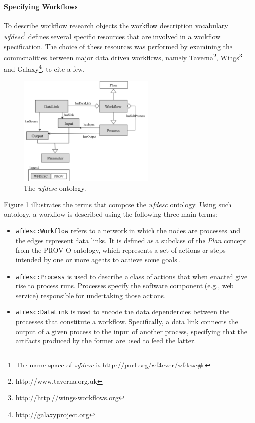 \paragraph{Specifying Workflows}
To describe workflow research objects the workflow description vocabulary \textit{wfdesc}\footnote{The name space of \textit{wfdesc} is \url{http://purl.org/wf4ever/wfdesc\#}.} defines several specific resources that are involved in a workflow specification. The choice of these resources was performed by examining the commonalities between major data driven workflows, namely Taverna\footnote{http://www.taverna.org.uk}, Wings\footnote{http://http://wings-workflows.org} and Galaxy\footnote{http://galaxyproject.org}, to cite a few.

\begin{figure}[ht]
  \centering
  \includegraphics[width=0.6\textwidth]{Figures/wfdesc.png}
  \caption{The \textit{wfdesc} ontology.}
  \label{fig:wfdesc}
\end{figure}

Figure \ref{fig:wfdesc} illustrates the terms that compose the \textit{wfdesc} ontology. Using such ontology, a workflow is described using the following three main terms:
\begin{itemize}
\item
\texttt{wfdesc:Workflow} refers to a network in which the nodes are processes and the edges represent data links. It is defined as a subclass of the \textit{Plan} concept from the PROV-O ontology, which represents a set of actions or steps intended by one or more agents to achieve some goals \cite{w3c-prov-o}. 
\item
\texttt{wfdesc:Process} is used to describe a class of actions that when enacted give rise to process runs. Processes specify the software component (e.g., web service) responsible for undertaking those actions.
\item
\texttt{wfdesc:DataLink} is used to encode the data dependencies between the processes that constitute a workflow. Specifically, a data link connects the output of a given process to the input of another process, specifying that the artifacts produced by the former are used to feed the latter.
\end{itemize}


